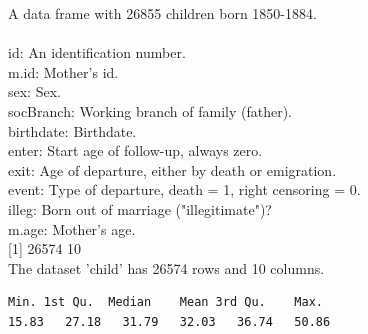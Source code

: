 \documentclass[12pt,letterpaper]{article}
\begin{document}

A data frame with 26855 children born 1850-1884.\\
\\
id: An identification number.\\
m.id: Mother's id.\\
sex: Sex.\\
socBranch: Working branch of family (father).\\
birthdate: Birthdate.\\
enter: Start age of follow-up, always zero.\\
exit: Age of departure, either by death or emigration.\\
event: Type of departure, death = 1, right censoring = 0.\\
illeg: Born out of marriage ("illegitimate")?\\
m.age: Mother's age.\\


[1] 26574    10\\
The dataset 'child' has 26574 rows and 10 columns.\\

\begin{verbatim}
Min. 1st Qu.  Median    Mean 3rd Qu.    Max. 
15.83   27.18   31.79   32.03   36.74   50.86 
\end{verbatim}
\end{document}

